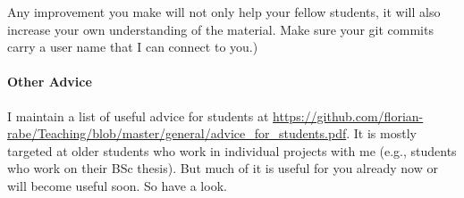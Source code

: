 Any improvement you make will not only help your fellow students, it will also increase your own understanding of the material.
Make sure your git commits carry a user name that I can connect to you.)

\paragraph{Other Advice}
I maintain a list of useful advice for students at \url{https://github.com/florian-rabe/Teaching/blob/master/general/advice_for_students.pdf}.
It is mostly targeted at older students who work in individual projects with me (e.g., students who work on their BSc thesis).
But much of it is useful for you already now or will become useful soon.
So have a look.